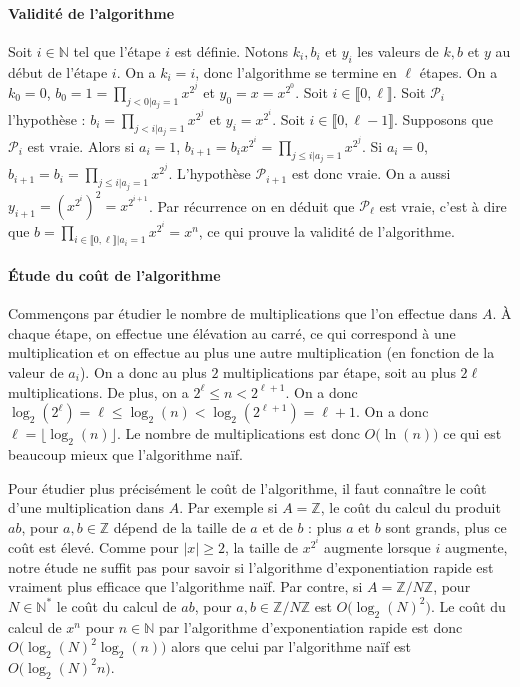 \documentclass[12pt]{report}
\newcommand{\N}{\mathbb{N}}
\newcommand{\Z}{\mathbb{Z}}
\newcommand{\PCC}{\mathscr{P}}
\begin{document}
\paragraph{Validité de l'algorithme} Soit $i\in \N$ tel que l'étape $i$ est définie. Notons $k_i, b_i$ et $y_i$ les valeurs de $k,b$ et $y$ au début de l'étape $i$. On a $k_i=i$, donc l'algorithme se termine en $\ell$ étapes. On a  $k_0=0$, $b_0=1=\prod_{j<0| a_j=1}x^{2^j}$  et $y_0=x=x^{2^0}$. Soit $i\in \llbracket 0,\ell\rrbracket$. Soit $\PCC_i$ l'hypothèse : 
$b_i=\prod_{j<i| a_j=1} x^{2^j}$ et $y_i=x^{2^i}$.
Soit $i\in \llbracket 0,\ell-1\rrbracket$. Supposons que $\PCC_i$ est vraie. Alors si $a_i=1$, $b_{i+1}=b_i x^{2^i}=\prod_{j\leq i|a_j=1}x^{2^j}$. Si 
$a_i=0$,   $b_{i+1}=b_i=\prod_{j\leq i|a_j=1}x^{2^j}$. L'hypothèse $\PCC_{i+1}$ est donc vraie. On a aussi $y_{i+1}=(x^{2^i})^2=x^{2^{i+1}}$. Par récurrence on en déduit que $\PCC_\ell$ est vraie, c'est à dire que $b=\prod_{i\in \llbracket 0,\ell\rrbracket| a_i=1} x^{2^i}=x^n$, ce qui prouve la validité de l'algorithme.
 
 
 \paragraph{Étude du coût de l'algorithme} Commençons par étudier le nombre de multiplications que l'on effectue dans $A$. À chaque étape, on effectue une élévation au carré, ce qui correspond à une multiplication et on effectue au plus une autre multiplication (en fonction de la valeur de $a_i$). On a donc au plus $2$ multiplications par étape, soit au plus $2\ell$ multiplications. De plus, on a $2^\ell \leq n<2^{\ell+1}$. On a donc $\log_2(2^\ell)=\ell\leq \log_2(n)<\log_2(2^{\ell+1})= \ell+1$. On a donc $\ell=\lfloor \log_2(n)\rfloor$. Le nombre de multiplications est donc $O\big(\ln(n)\big)$ ce qui est beaucoup mieux que l'algorithme naïf. 
 
 Pour étudier plus précisément le coût de l'algorithme, il faut connaître le coût d'une multiplication dans $A$. Par exemple  si $A=\Z$, le coût du calcul du produit $ab$, pour $a,b\in \Z$ dépend de la taille de $a$ et de $b$ : plus $a$ et $b$ sont grands, plus ce coût est élevé. Comme pour $|x|\geq 2$, la taille de $x^{2^i}$ augmente lorsque $i$ augmente, notre étude ne suffit pas pour savoir si l'algorithme d'exponentiation rapide est vraiment plus efficace que l'algorithme naïf. Par contre, si $A=\Z/N\Z$, pour $N\in \N^*$   le coût du calcul de $ab$, pour $a,b\in \Z/N\Z$ est $O\big(\log_2(N)^2\big)$. Le coût du calcul de $x^n$ pour $n\in \N$ par l'algorithme d'exponentiation rapide est donc $O\big(\log_2(N)^2\log_2(n)\big)$ alors que celui par l'algorithme  naïf est $O\big(\log_2(N)^2n\big)$.
 
\end{document}
